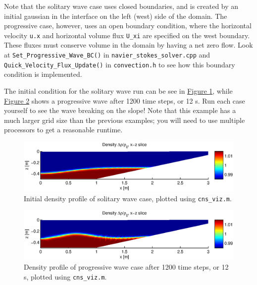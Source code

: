 \documentclass[12pt]{report}
\begin{document}
Note that the solitary wave case uses closed boundaries, and is created by an initial gaussian in the interface on the left (west) side of the domain. The progressive case, however, uses an open boundary condition, where the horizontal velocity \texttt{u.x} and horizontal volume flux \texttt{U\_xi} are specified on the west boundary. These fluxes must conserve volume in the domain by having a net zero flow. Look at \texttt{Set\_Progressive\_Wave\_BC()} in \texttt{navier\_stokes\_solver.cpp} and \texttt{Quick\_Velocity\_Flux\_Update()} in \texttt{convection.h} to see how this boundary condition is implemented.

The initial condition for the solitary wave run can be see in \hyperref[fig:solitary]{Figure \ref*{fig:solitary}}, while \hyperref[fig:progressive]{Figure \ref*{fig:progressive}} shows a progressive wave after 1200 time steps, or 12 s. Run each case yourself to see the wave breaking on the slope! Note that this example has a much larger grid size than the previous examples; you will need to use multiple processors to get a reasonable runtime.
\begin{figure}
\centering
\includegraphics[scale=0.9]{solitary}
\caption{Initial density profile of solitary wave case, plotted using \texttt{cns\_viz.m}.}
\label{fig:solitary}
\end{figure}
\begin{figure}
\centering
\includegraphics[scale=0.9]{progressive}
\caption{Density profile of progressive wave case after 1200 time steps, or 12 s, plotted using \texttt{cns\_viz.m}.}
\label{fig:progressive}
\end{figure}



\end{document}

